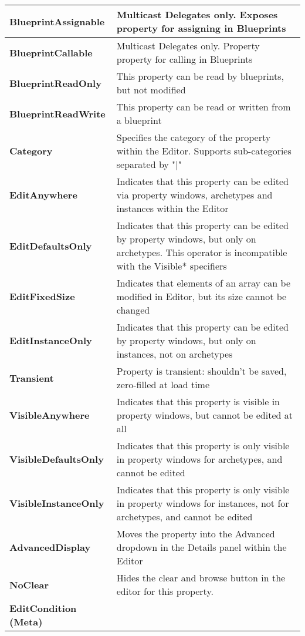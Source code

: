 \documentclass[10pt,a4paper]{article}
\begin{document}
\begin{multicols*}{2}
\begin{tabularx}{\columnwidth}{|p{3.5cm}|X|}
		\hline \textbf{BlueprintAssignable}
		&  Multicast Delegates only. Exposes property for assigning in Blueprints  \\
		\hline \textbf{BlueprintCallable}
		&   Multicast Delegates only. Property property for calling in Blueprints \\
		\hline \textbf{BlueprintReadOnly}
		& This property can be read by blueprints, but not modified \\ 
		\hline \textbf{BlueprintReadWrite}
		&  This property can be read or written from a blueprint \\
		\hline \textbf{Category} 
		& Specifies the category of the property within the Editor. Supports sub-categories separated by "$\vert$" \\ 
		\hline \textbf{EditAnywhere}
		&  Indicates that this property can be edited via property windows, archetypes and instances within the Editor \\ 
		\hline \textbf{EditDefaultsOnly}
		& Indicates that this property can be edited by property windows, but only on archetypes. This operator is incompatible with the Visible* specifiers \\ 
		\hline \textbf{EditFixedSize}
		& Indicates that elements of an array can be modified in Editor, but its size cannot be changed \\ 
		\hline \textbf{EditInstanceOnly}
		&  Indicates that this property can be edited by property windows, but only on instances, not on archetypes \\ 
		\hline \textbf{Transient}
		& Property is transient: shouldn't be saved, zero-filled at load time \\ 
		\hline \textbf{VisibleAnywhere}
		& Indicates that this property is visible in property windows, but cannot be edited at all \\ 
		\hline \textbf{VisibleDefaultsOnly}
		& Indicates that this property is only visible in property windows for archetypes, and cannot be edited \\ 
		\hline \textbf{VisibleInstanceOnly}
		& Indicates that this property is only visible in property windows for instances, not for archetypes, and cannot be edited \\ 
		\hline \textbf{AdvancedDisplay}
		& Moves the property into the Advanced dropdown in the Details panel within the Editor \\
		\hline \textbf{NoClear}
		& Hides the clear and browse button in the editor for this property. \\
		\hline \textbf{EditCondition (Meta)}

\end{tabularx}
\end{multicols*}
\end{document}
